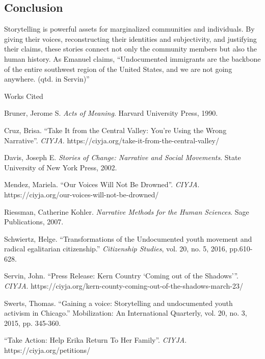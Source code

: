 \documentclass[12pt]{article}
\newcommand{\bibent}{\noindent \hangindent 40pt}
\newenvironment{workscited}{\newpage \begin{center} Works Cited \end{center}}{\newpage }
\begin{document}
\begin{flushleft}
\section{Conclusion}

Storytelling is powerful assets for marginalized communities and individuals.
By giving their voices, reconstructing their identities and subjectivity, and justifying their claims, these stories connect not only the community members but also the human history.
As Emanuel claims, ``Undocumented immigrants are the backbone of the entire southwest region of the United States, and we are not going anywhere. (qtd. in Servin)'' %

\begin{workscited}

\bibent
Bruner, Jerome S. \textit{Acts of Meaning}. Harvard University Press, 1990.

\bibent
Cruz, Brisa. ``Take It from the Central Valley: You're Using the Wrong Narrative''. \textit{CIYJA}. https://ciyja.org/take-it-from-the-central-valley/

\bibent
Davis, Joseph E. \textit{Stories of Change: Narrative and Social Movements}. State University of New York Press, 2002.

\bibent
Mendez, Mariela. ``Our Voices Will Not Be Drowned''. \textit{CIYJA}. https://ciyja.org/our-voices-will-not-be-drowned/

\bibent
Riessman, Catherine Kohler. \textit{Narrative Methods for the Human Sciences}. Sage Publications, 2007.

\bibent
Schwiertz, Helge. ``Transformations of the Undocumented youth movement and radical egalitarian citizenship.'' \textit{Citizenship Studies}, vol. 20, no. 5, 2016, pp.610-628.

\bibent
Servin, John. ``Press Release: Kern Country `Coming out of the Shadows'''. \textit{CIYJA}. https://ciyja.org/kern-county-coming-out-of-the-shadows-march-23/

\bibent
Swerts, Thomas. ``Gaining a voice: Storytelling and undocumented youth activism in Chicago.'' Mobilization: An International Quarterly, vol. 20, no. 3, 2015, pp. 345-360.

\bibent
``Take Action: Help Erika Return To Her Family''. \textit{CIYJA}. https://ciyja.org/petitions/
\end{workscited}

\end{flushleft}
\end{document}
